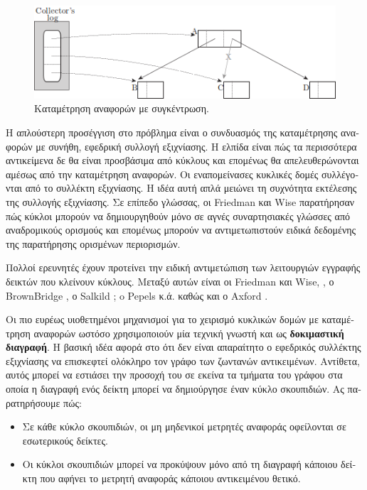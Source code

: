 \begin{greek}
\begin{figure}[H]
  \centering
  \includegraphics{figures/refcnt_1}
  \caption{Καταμέτρηση αναφορών με συγκέντρωση.}
  \label{fig:refcnt_1}  
\end{figure}

Η απλούστερη προσέγγιση στο πρόβλημα είναι ο συνδυασμός της
καταμέτρησης αναφορών με συνήθη, εφεδρική συλλογή εξιχνίασης.
Η ελπίδα είναι πώς τα περισσότερα αντικείμενα δε θα είναι 
προσβάσιμα από κύκλους και επομένως θα απελευθερώνονται
αμέσως από την καταμέτρηση αναφορών. Οι εναπομείνασες
κυκλικές δομές συλλέγονται από το συλλέκτη εξιχνίασης. Η
ιδέα αυτή απλά μειώνει τη συχνότητα εκτέλεσης της συλλογής
εξιχνίασης. Σε επίπεδο γλώσσας, οι Friedman και Wise
\cite{DBLP:journals/ipl/FriedmanW79} παρατήρησαν πώς κύκλοι
μπορούν να δημιουργηθούν μόνο σε αγνές συναρτησιακές γλώσσες
από αναδρομικούς ορισμούς και επομένως μπορούν να
αντιμετωπιστούν ειδικά δεδομένης της παρατήρησης ορισμένων
περιορισμών.

Πολλοί ερευνητές έχουν προτείνει την ειδική αντιμετώπιση
των λειτουργιών εγγραφής δεικτών που κλείνουν κύκλους.
Μεταξύ αυτών είναι οι Friedman και Wise,
\cite{DBLP:journals/ipl/FriedmanW79}, ο BrownBridge
\cite{DBLP:conf/fpca/Brownbridge85}, ο Salkild
\cite{salkild1987implementation}; o Pepels κ.ά.
\cite{pepels1988cyclic} καθώς και ο Axford
\cite{DBLP:journals/cj/Axford90}.

Οι πιο ευρέως υιοθετημένοι μηχανισμοί για το χειρισμό
κυκλικών δομών με καταμέτρηση αναφορών ωστόσο χρησιμοποιούν
μία τεχνική γνωστή και ως \textbf{δοκιμαστική διαγραφή}.
Η βασική ιδέα αφορά στο ότι δεν είναι απαραίτητο ο εφεδρικός
συλλέκτης εξιχνίασης να επισκεφτεί ολόκληρο τον γράφο των
ζωντανών αντικειμένων. Αντίθετα, αυτός μπορεί να εστιάσει
την προσοχή του σε εκείνα τα τμήματα του γράφου στα οποία
η διαγραφή ενός δείκτη μπορεί να δημιούργησε έναν κύκλο
σκουπιδιών. Ας παρατηρήσουμε πώς:

\begin{itemize}
  \item Σε κάθε κύκλο σκουπιδιών, οι μη μηδενικοί μετρητές
    αναφοράς οφείλονται σε εσωτερικούς δείκτες.
  \item Οι κύκλοι σκουπιδιών μπορεί να προκύψουν μόνο από τη
    διαγραφή κάποιου δείκτη που αφήνει το μετρητή αναφοράς
    κάποιου αντικειμένου θετικό.
\end{itemize} 


\end{greek}
